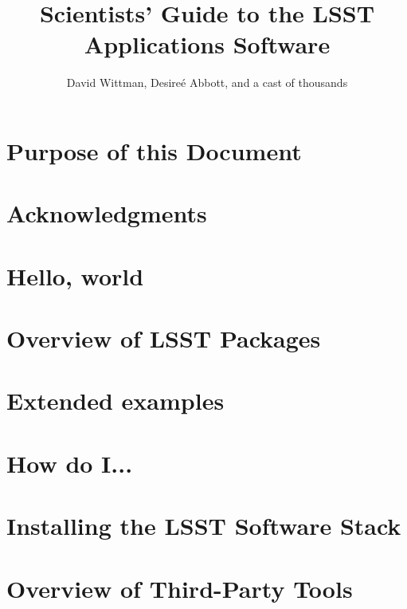 \documentclass{book}
\title{Scientists' Guide to the LSST Applications Software}
\author{David Wittman, Desire\'{e} Abbott, and a cast of thousands}
\begin{document}
\maketitle


\chapter*{Purpose of this Document\label{cha:purpose}}


\chapter*{Acknowledgments\label{cha:acknowledgements}}



\chapter{Hello, world\label{chap-hello}}


\chapter{Overview of LSST Packages\label{chap-overview}}



\chapter{Extended examples\label{cha:examples}}


\chapter{How do I...\label{cha:howto}}



%
% 



\appendix

\chapter{Installing the LSST Software Stack\label{appendix-stackinstall}}


\chapter{Overview of Third-Party Tools\label{appendix-thirdparty}}

\end{document}

